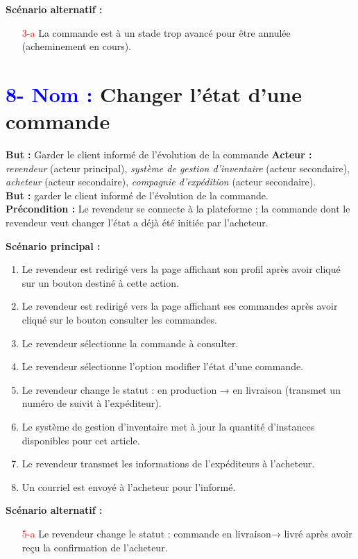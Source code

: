 \documentclass[16pt]{report}
\begin{document}
\textbf{Scénario alternatif :}
\begin{enumerate}[leftmargin=4em]
    \item[\textcolor{red}{3-a}] La commande est à un stade trop avancé pour être annulée (acheminement en cours).
\end{enumerate}


\section*{\textbf{\textcolor{blue}{8- Nom :}} Changer l’état d’une commande}

\textbf{But :} Garder le client informé de l’évolution de la commande  
\textbf{Acteur :} \textit{revendeur} (acteur principal), \textit{système de gestion d’inventaire} (acteur secondaire), \textit{acheteur} (acteur secondaire), \textit{compagnie d’expédition} (acteur secondaire). \\
\textbf{But :} garder le client informé de l'évolution de la commande. \\
\textbf{Précondition :} Le revendeur se connecte à la plateforme ; la commande dont le revendeur veut changer l’état a déjà été initiée par l’acheteur.

\textbf{Scénario principal :}
\begin{enumerate}[leftmargin=4em]
    \item Le revendeur est redirigé vers la page affichant son profil après avoir cliqué sur un bouton destiné à cette action.
    \item Le revendeur est redirigé vers la page affichant ses commandes après avoir cliqué sur le bouton consulter les commandes.
    \item Le revendeur sélectionne la commande à consulter.
    \item Le revendeur sélectionne l’option modifier l’état d’une commande.
    \item Le revendeur change le statut :  en production → en livraison (transmet un numéro de suivit à l’expéditeur).
    \item Le système de gestion d’inventaire met à jour la quantité d’instances disponibles pour cet article.
    \item Le revendeur transmet les informations de l’expéditeurs à l’acheteur.
    \item Un courriel est envoyé à l’acheteur pour l’informé.
\end{enumerate}

\textbf{Scénario alternatif :}
\begin{enumerate}[leftmargin=4em]
    \item[\textcolor{red}{5-a}] Le revendeur change le statut : commande en livraison→ livré après avoir reçu la confirmation de l’acheteur.
\end{enumerate}
\end{document}
